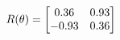 \documentclass[preview]{standalone}
\begin{document}
\begin{align*}
\special{dvisvgm:raw <g id='unique000'>}R(\theta) = \begin{bmatrix}0.36 & 0.93\\-0.93 & 0.36\end{bmatrix}\special{dvisvgm:raw </g>}
\end{align*}
\end{document}
